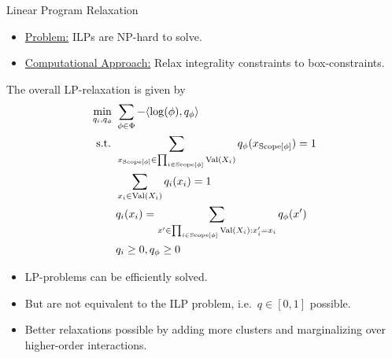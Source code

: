 \begin{frame}{Linear Program Relaxation}
    \begin{itemize}
        \item \underline{Problem:} ILPs are NP-hard to solve.
        \pause \item \underline{Computational Approach:} Relax integrality constraints to box-constraints.
    \end{itemize}
\pause
The overall LP-relaxation is given by
\begin{equation}
    \begin{aligned}
    \min_{q_i, q_{\phi}} \ & \sum_{\phi \in \Phi} - \la \log( \phi ), q_{\phi} \ra \\
    \text{s.t. } 
    & \sum_{x_{\Scope[\phi]} \in \prod_{i \in \Scope[\phi]}\Val(X_i)} q_{\phi}(x_{\Scope[\phi]}) = 1 \\
    & \sum_{x_i \in \Val(X_i)} q_{i}(x_{i}) = 1 \\
    & q_i(x_i) = \sum_{x' \in \prod_{i \in \Scope[\phi]} \Val(X_i) : x'_i = x_i} q_{\phi}(x') \\
    & q_i \geq 0, q_{\phi} \geq 0
    \end{aligned}
\end{equation}
\begin{itemize}
    \pause \item LP-problems can be efficiently solved.
    \pause \item But are not equivalent to the ILP problem, i.e.\ $q \in [0,1]$ possible.
    \pause \item Better relaxations possible by adding more clusters and marginalizing over higher-order interactions.
\end{itemize}
\end{frame}
